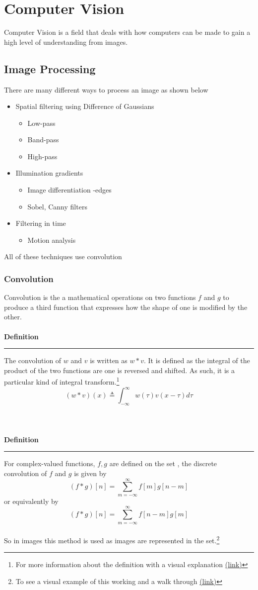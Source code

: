 \section{Computer Vision}
Computer Vision is a field that deals with how computers can be made to gain a high level of understanding from images.
\subsection{Image Processing}
There are many different ways to process an image as shown below
\begin{itemize}
    \item Spatial filtering using Difference of Gaussians
    \begin{itemize}
        \item Low-pass 
        \item Band-pass
        \item High-pass
    \end{itemize}
    \item Illumination gradients
    \begin{itemize}
        \item Image differentiation -edges
        \item Sobel, Canny filters
    \end{itemize}
    \item Filtering in time
    \begin{itemize}
        \item Motion analysis
    \end{itemize}
\end{itemize}
All of these techniques use convolution 
\subsubsection{Convolution}
Convolution is the a mathematical operations on two functions $f$ and $g$ to produce a third function that expresses how the shape of one is modified by the other.
\\\\
\textbf{Definition}
\smallskip
\hrule
\bigskip
The convolution of $w$ and $v$ is written as $w*v$. It is defined as the integral of the product of the two functions are one is reversed and shifted. As such, it is a particular kind of integral transform.\footnote{For more  information about the definition with a visual explanation \href{https://en.wikipedia.org/wiki/Convolution}{(link)}  }
\[
(w*v)(x) \triangleq \int_{-\infty}^{\infty} w(\tau)v(x-\tau)d\tau
\]
\\
\\\\
\textbf{Definition}
\smallskip
\hrule
\bigskip
For complex-valued functions, $f,g$ are defined on the set , the discrete convolution of $f$ and $g$ is given by
\[
(f*g)[n] = \sum_{m = -\infty}^{\infty}f[m]g[n-m]
\]
or equivalently by
\[
(f*g)[n] = \sum_{m = -\infty}^{\infty}f[n-m]g[m]
\]
\\
So in images this method is used as images are represented in the  set.\footnote{To see a visual example of this working and a walk through \href{http://www.songho.ca/dsp/convolution/convolution2d_example.html}{(link)}} 
